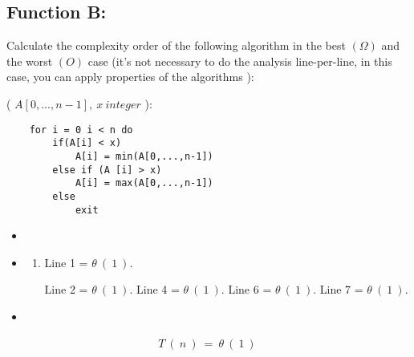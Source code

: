 \subsection{Function B:}

Calculate the complexity order of the following algorithm in the best $(\Omega)$ and the worst $(O)$
case (it's not necessary to do the analysis line-per-line, in this case, you can apply
properties of the algorithms ):\hfill \break

{{\bfseries\color{Violet}{Function B}}  ( $A[0,...,n-1],\ x\ integer$ ):

\begin{lstlisting}
	for i = 0 i < n do 
		if(A[i] < x)
			A[i] = min(A[0,...,n-1])
		else if (A [i] > x)
			A[i] = max(A[0,...,n-1])
		else
			exit
\end{lstlisting} \hfill

\begin{itemize}
\item {\bfseries\itshape\color{Maroon}{Demonstration:}} 
\end{itemize} 

{\bfseries\itshape\color{armygreen}{Observation:}} {\itshape\color{armygreen}{Best case: Let 'x' be in the first position of A.}} 

\begin{itemize}
\item {\bfseries\itshape\color{Violet}{Analyzing the complexity of each line:}}
\begin{enumerate}
\item Line 1 = $\theta\ (\ 1\ )$.
\begin{tasks}
\task Line 2 = $\theta\ (\ 1\ )$.
\task Line 4 = $\theta\ (\ 1\ )$.
\task Line 6 = $\theta\ (\ 1\ )$.
\task Line 7 = $\theta\ (\ 1\ )$.
\end{tasks}
\end{enumerate}
\end{itemize} 

{\bfseries\itshape\color{armygreen}{Observation:}} {\itshape\color{armygreen}{The lines 3 and 5 doesn't count because 'x' doesn't fulfill the condition.}} 

\begin{itemize}
\item {\bfseries\itshape\color{Violet}{Then, from all lines we can conclude:}}
\end{itemize} \hfill

\begin{ceqn}
\begin{align}
T\ (\ n\ )\ =\ \theta\ (\ 1\ )\
\end{align}
\end{ceqn} \hfill

}
